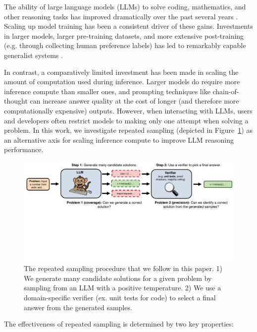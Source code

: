\documentclass[11pt]{article}
\begin{document}
The ability of large language models (LLMs) to solve coding, mathematics, and other reasoning tasks has improved dramatically over the past several years \cite{radford2019language, brown2020languagemodelsfewshotlearners}. Scaling up model training has been a consistent driver of these gains. Investments in larger models, larger pre-training datasets, and more extensive post-training (e.g. through collecting human preference labels) has led to remarkably capable generalist systems \cite{gpt4o, metallama, sonnet35,geminiteam2024geminifamilyhighlycapable}.

In contrast, a comparatively limited investment has been made in scaling the amount of computation used during inference. Larger models do require more inference compute than smaller ones, and prompting techniques like chain-of-thought \cite{wei2023chainofthought} can increase answer quality at the cost of longer (and therefore more computationally expensive) outputs. However, when interacting with LLMs, users and developers often restrict models to making only one attempt when solving a problem. In this work, we investigate repeated sampling (depicted in Figure~\ref{fig:banner}) as an alternative axis for scaling inference compute to improve LLM reasoning performance.

\begin{figure}[t]
    \centering
    \includegraphics[width=\textwidth]{figures/banner.pdf}
    \caption{The repeated sampling procedure that we follow in this paper. 1) We generate many candidate solutions for a given problem by sampling from an LLM with a positive temperature. 2) We use a domain-specific verifier (ex. unit tests for code) to select a final answer from the generated samples.}  
    \label{fig:banner}
\end{figure}

The effectiveness of repeated sampling is determined by two key properties:
\end{document}
